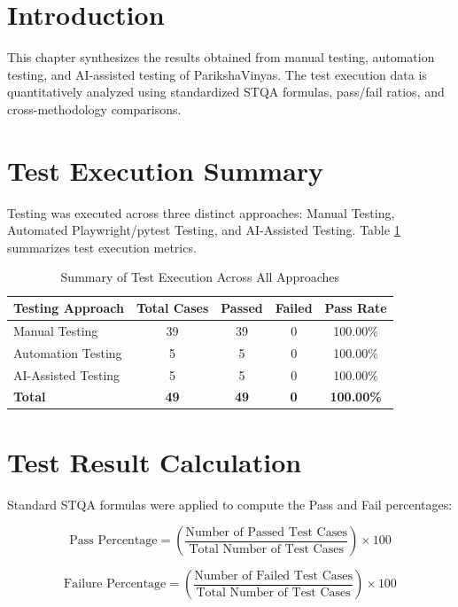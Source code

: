 \documentclass{InternshipReport}
\begin{document}
\section{Introduction}
This chapter synthesizes the results obtained from manual testing, automation testing, and AI-assisted testing of ParikshaVinyas. The test execution data is quantitatively analyzed using standardized STQA formulas, pass/fail ratios, and cross-methodology comparisons.

\section{Test Execution Summary}
Testing was executed across three distinct approaches: Manual Testing, Automated Playwright/pytest Testing, and AI-Assisted Testing. Table \ref{tab:exec_summary} summarizes test execution metrics.

\begin{table}[H]
\centering
\caption{Summary of Test Execution Across All Approaches}
\label{tab:exec_summary}
\begin{tabular}{l c c c c}
\toprule
\textbf{Testing Approach} & \textbf{Total Cases} & \textbf{Passed} & \textbf{Failed} & \textbf{Pass Rate} \\
\midrule
Manual Testing & 39 & 39 & 0 & 100.00\% \\
Automation Testing & 5 & 5 & 0 & 100.00\% \\
AI-Assisted Testing & 5 & 5 & 0 & 100.00\% \\
\midrule
\textbf{Total} & \textbf{49} & \textbf{49} & \textbf{0} & \textbf{100.00\%} \\
\bottomrule
\end{tabular}
\end{table}

\section{Test Result Calculation}
Standard STQA formulas were applied to compute the Pass and Fail percentages:

\begin{equation}
\text{Pass Percentage} = \left( \frac{\text{Number of Passed Test Cases}}{\text{Total Number of Test Cases}} \right) \times 100
\end{equation}

\begin{equation}
\text{Failure Percentage} = \left( \frac{\text{Number of Failed Test Cases}}{\text{Total Number of Test Cases}} \right) \times 100
\end{equation}
\end{document}
